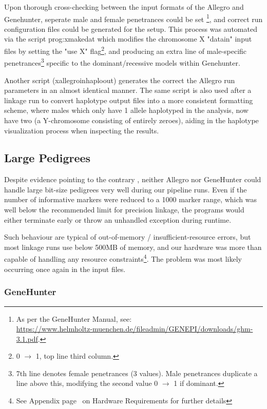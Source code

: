 Upon thorough cross-checking between the input formats of the Allegro and Genehunter, seperate male and female penetrances could be set \footnote{As per the GeneHunter Manual, see:\\\url{https://www.helmholtz-muenchen.de/fileadmin/GENEPI/downloads/ghm-3.1.pdf}.}, and correct run configuration files could be generated for the setup. This process was automated via the script \gls{prog:xmakedat} which modifies the chromosome X "datain" input files by setting the "use X" flag\footnote{0 $\rightarrow$ 1, top line third column.}, and producing an extra line of male-specific penetrances\footnote{7th line denotes female penetrances (3 values). Male penetrances duplicate a line above this, modifying the second value 0 $\rightarrow$ 1 if dominant.} specific to the dominant/recessive models within Genehunter.

Another script (xallegroinhaploout) generates the correct the Allegro run parameters in an almost identical manner. The same script is also used after a linkage run to convert haplotype output files into a more consistent formatting scheme, where males which only have 1 allele haplotyped in the analysis, now have two (a Y-chromosome consisting of entirely zeroes), aiding in the haplotype visualization process when inspecting the results.


\subsection{Large Pedigrees}\label{ref:meth:largepeds}

Despite evidence pointing to the contrary \citep{allegro_2005,ghm_2014}, neither Allegro nor GeneHunter could handle large bit-size pedigrees very well during our pipeline runs. Even if the number of informative markers were reduced to a 1000 marker range, which was well below the recommended limit for precision linkage, the programs would either terminate early or throw an unhandled exception during runtime. 

Such behaviour are typical of out-of-memory / insufficient-resource errors, but most linkage runs use below 500MB of memory, and our hardware was more than capable of handling any resource constraints\footnote{See Appendix page~\pageref{ref:app:hwspec} on Hardware Requirements for further details}. The problem was most likely occurring once again in the input files.

\subsubsection{GeneHunter}

